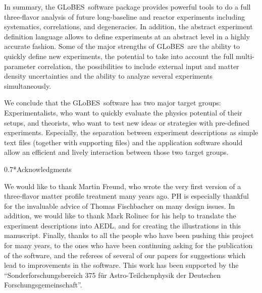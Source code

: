 \documentclass[12pt,a4paper]{article}
\makeatletter
\renewcommand{\subsection}%
{\@startsection{subsection}{2}{0em}{-0.7\baselineskip}%
{0.7\baselineskip}{\normalfont\bfseries}}
\newcommand{\GLOBES}{{\sf GLoBES}}
\newcommand{\AEDL}{{\sf AEDL}}
\makeatother
\begin{document}
In summary, the \GLOBES\ software package provides powerful tools
to do a full three-flavor analysis of future long-baseline and reactor
 experiments
including systematics, correlations, and degeneracies. In addition,
the abstract experiment definition language allows to define
experiments at an abstract level in a highly accurate fashion. 
Some of the major strengths of \GLOBES\ are the ability to quickly
define new experiments, the potential to take into account the
full multi-parameter correlation, the possibilities to include
external input and matter density uncertainties and 
the ability to analyze several experiments simultaneously.

We conclude that the \GLOBES\ software has two major target groups:
Experimentalists, who want to quickly evaluate the physics potential
of their setups, and theorists, who want to test new ideas or
strategies with pre-defined experiments. Especially, the separation
between experiment descriptions as simple text files (together
with supporting files) and the application software should allow an
efficient and lively interaction between those two target groups.

\subsection*{Acknowledgments}

We would like to thank Martin Freund, who wrote the very first
version of a three-flavor matter profile treatment many years ago.
PH is especially thankful for the invaluable advice of Thomas Fischbacher on
many design issues. 
In addition, we would like to thank
Mark Rolinec for his help to translate the experiment descriptions
into \AEDL , and for creating the illustrations in this manuscript.
Finally, thanks to all the people who have been pushing this project
for many years, to the ones who have been continuing asking for the 
publication of the software, and the referees of several of our
papers for suggestions which lead to improvements in the software.
This work has been supported by the ``Sonderforschungsbereich
375 f\"ur Astro-Teilchenphysik der Deutschen Forschungsgemeinschaft''.


\end{document}
